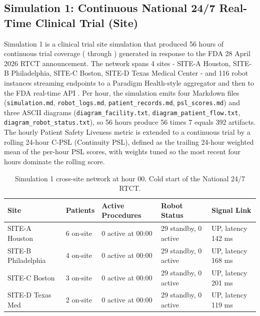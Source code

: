
\subsection{Simulation 1: Continuous National 24/7 Real-Time Clinical Trial (Site)}
\label{sec:results-sim1}

Simulation 1 is a clinical trial site simulation that produced 56 hours
of continuous trial coverage ( through )
generated in response to the FDA 28 April 2026 RTCT announcement. The
network spans 4 sites - SITE-A Houston, SITE-B Philadelphia, SITE-C
Boston, SITE-D Texas Medical Center - and 116 robot instances streaming
endpoints to a Paradigm Health-style aggregator and then to the FDA
real-time API \cite{fda2026realtime, kawchak_2026_19176370,
kawchak_2026_19244918}. Per hour, the simulation emits four Markdown
files (\texttt{simulation.md}, \texttt{robot\_logs.md},
\texttt{patient\_records.md}, \texttt{psl\_scores.md}) and three ASCII
diagrams (\texttt{diagram\_facility.txt},
\texttt{diagram\_patient\_flow.txt},
\texttt{diagram\_robot\_status.txt}), so 56 hours produce 56 times 7
equals 392 artifacts. The hourly Patient Safety Liveness metric is
extended to a continuous trial by a rolling 24-hour C-PSL (Continuity
PSL), defined as the trailing 24-hour weighted mean of the per-hour
PSL scores, with weights tuned so the most recent four hours dominate
the rolling score.

\begin{table}[H]
\centering
\caption{Simulation 1 cross-site network at hour 00. Cold start of the
National 24/7 RTCT.}
\label{tab:sim1-hour00-network}
\begin{tabular}{L{2.1cm} L{2.4cm} L{3.1cm} L{3.6cm} L{3.3cm}}
\toprule
\textbf{Site} & \textbf{Patients} & \textbf{Active Procedures} & \textbf{Robot Status} & \textbf{Signal Link} \\
\midrule
SITE-A Houston      & 6 on-site & 0 active at 00:00 & 29 standby, 0 active & UP, latency 142 ms \\
SITE-B Philadelphia & 4 on-site & 0 active at 00:00 & 29 standby, 0 active & UP, latency 168 ms \\
SITE-C Boston       & 3 on-site & 0 active at 00:00 & 29 standby, 0 active & UP, latency 201 ms \\
SITE-D Texas Med & 2 on-site & 0 active at 00:00 & 29 standby, 0 active & UP, latency 119 ms \\
\bottomrule
\end{tabular}
\end{table}

